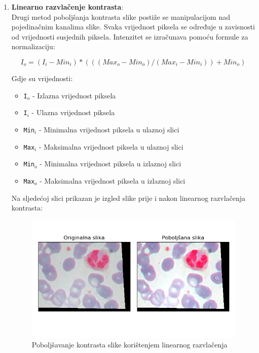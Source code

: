 \documentclass[12pt,a4paper]{article}
\begin{document}
\begin{enumerate}
\item \textbf{Linearno razvlačenje kontrasta}: \\

Drugi metod poboljšanja kontrasta slike postiže se manipulacijom nad pojedinačnim kanalima slike. Svaka vrijednost piksela se određuje u zavisnosti od vrijednosti susjednih piksela. Intenzitet se izračunava pomoću formule za normalizaciju:

\[
	I_o = (I_i - Min_i) * (((Max_o - Min_o) / (Max_i - Min_i)) + Min_o)
\]

Gdje su vrijednosti:

\begin{itemize}

\item \texttt{I$_o$} - Izlazna vrijednost piksela
\item \texttt{I$_i$} - Ulazna vrijednost piksela
\item \texttt{Min$_i$} - Minimalna vrijednost piksela u ulaznoj slici
\item \texttt{Max$_i$} - Maksimalna vrijednost piksela u ulaznoj slici
\item \texttt{Min$_o$} - Minimalna vrijednost piksela u izlaznoj slici
\item \texttt{Max$_o$} - Maksimalna vrijednost piksela u izlaznoj slici

\end{itemize}

Na sljedećoj slici prikazan je izgled slike prije i nakon linearnog razvlačenja kontrasta:

\begin{figure}[H]

\center
\includegraphics[scale=0.9]{s4Kontrast2.png}
\caption{Poboljšavanje kontrasta slike korištenjem linearnog razvlačenja}
	

\end{figure}
\end{enumerate}
\end{document}
